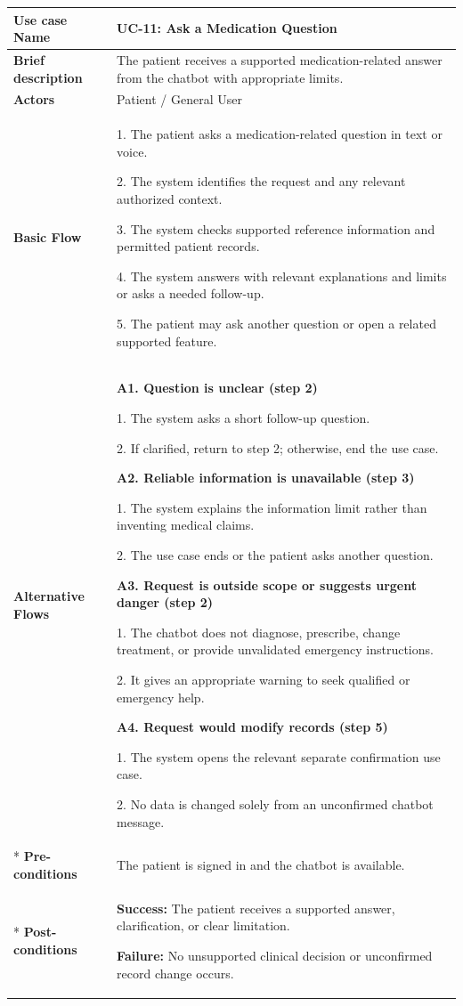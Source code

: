 \begin{longtable}{|p{}|p{}|}
\hline
\textbf{Use case Name} & UC-11: Ask a Medication Question \\ \hline
\textbf{Brief description} & The patient receives a supported medication-related answer from the chatbot with appropriate limits. \\ \hline
\textbf{Actors} & Patient / General User \\ \hline
\textbf{Basic Flow} &
1. The patient asks a medication-related question in text or voice.\par
2. The system identifies the request and any relevant authorized context.\par
3. The system checks supported reference information and permitted patient records.\par
4. The system answers with relevant explanations and limits or asks a needed follow-up.\par
5. The patient may ask another question or open a related supported feature.
\\ \hline
\textbf{Alternative Flows} &
\textbf{A1. Question is unclear (step 2)}\par
1. The system asks a short follow-up question.\par
2. If clarified, return to step 2; otherwise, end the use case.
\par
\textbf{A2. Reliable information is unavailable (step 3)}\par
1. The system explains the information limit rather than inventing medical claims.\par
2. The use case ends or the patient asks another question.
\par
\textbf{A3. Request is outside scope or suggests urgent danger (step 2)}\par
1. The chatbot does not diagnose, prescribe, change treatment, or provide unvalidated emergency instructions.\par
2. It gives an appropriate warning to seek qualified or emergency help.
\par
\textbf{A4. Request would modify records (step 5)}\par
1. The system opens the relevant separate confirmation use case.\par
2. No data is changed solely from an unconfirmed chatbot message.
\\* \hline
\textbf{Pre-conditions} & The patient is signed in and the chatbot is available. \\* \hline
\textbf{Post-conditions} & \textbf{Success:} The patient receives a supported answer, clarification, or clear limitation.\par
\textbf{Failure:} No unsupported clinical decision or unconfirmed record change occurs. \\ \hline
\end{longtable}

